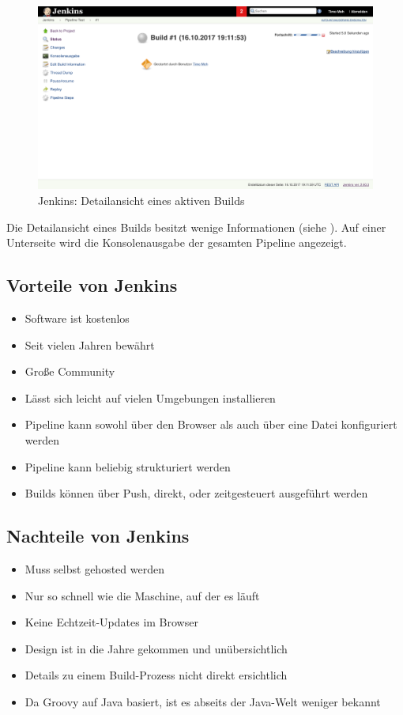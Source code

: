 \begin{figure}[h]
  \caption{Jenkins: Detailansicht eines aktiven Builds}
  \label{fig:jenkins-build-detail}
  \includegraphics[width=.8\textwidth]{assets/jenkins-build-detail}
\end{figure}

Die Detailansicht eines Builds besitzt wenige Informationen (siehe ). Auf einer Unterseite wird die Konsolenausgabe der gesamten Pipeline angezeigt.

\subsection*{Vorteile von Jenkins}

\begin{itemize}
  \item Software ist kostenlos
  \item Seit vielen Jahren bewährt
  \item Große Community
  \item Lässt sich leicht auf vielen Umgebungen installieren
  \item Pipeline kann sowohl über den Browser als auch über eine Datei konfiguriert werden
  \item Pipeline kann beliebig strukturiert werden
  \item Builds können über Push, direkt, oder zeitgesteuert ausgeführt werden
\end{itemize}

\subsection*{Nachteile von Jenkins}

\begin{itemize}
  \item Muss selbst gehosted werden
  \item Nur so schnell wie die Maschine, auf der es läuft
  \item Keine Echtzeit-Updates im Browser
  \item Design ist in die Jahre gekommen und unübersichtlich
  \item Details zu einem Build-Prozess nicht direkt ersichtlich
  \item Da Groovy auf Java basiert, ist es abseits der Java-Welt weniger bekannt
\end{itemize}

